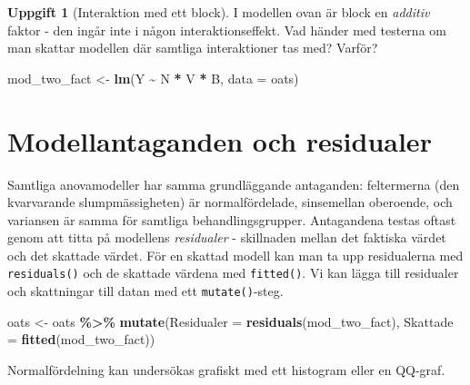 \documentclass[
]{book}
\newenvironment{Shaded}{\begin{snugshade}}{\end{snugshade}}
\newcommand{\AttributeTok}[1]{\textcolor[rgb]{0.13,0.29,0.53}{#1}}
\newcommand{\FunctionTok}[1]{\textcolor[rgb]{0.13,0.29,0.53}{\textbf{#1}}}
\newcommand{\NormalTok}[1]{#1}
\newcommand{\OtherTok}[1]{\textcolor[rgb]{0.56,0.35,0.01}{#1}}
\newcommand{\SpecialCharTok}[1]{\textcolor[rgb]{0.81,0.36,0.00}{\textbf{#1}}}
\theoremstyle{definition}
\theoremstyle{definition}
\theoremstyle{definition}
\newtheorem{exercise}{Uppgift}[chapter]
\theoremstyle{definition}
\theoremstyle{remark}
\begin{document}
\begin{exercise}[Interaktion med ett block]

I modellen ovan är block en \emph{additiv} faktor - den ingår inte i någon interaktionseffekt. Vad händer med testerna om man skattar modellen där samtliga interaktioner tas med? Varför?

\begin{Shaded}
\begin{Highlighting}[]
\NormalTok{mod\_two\_fact }\OtherTok{\textless{}{-}} \FunctionTok{lm}\NormalTok{(Y }\SpecialCharTok{\textasciitilde{}}\NormalTok{ N }\SpecialCharTok{*}\NormalTok{ V }\SpecialCharTok{*}\NormalTok{ B, }\AttributeTok{data =}\NormalTok{ oats)}
\end{Highlighting}
\end{Shaded}

\end{exercise}

\section{Modellantaganden och residualer}\label{modellantaganden-och-residualer}

Samtliga anovamodeller har samma grundläggande antaganden: feltermerna (den kvarvarande slumpmässigheten) är normalfördelade, sinsemellan oberoende, och variansen är samma för samtliga behandlingsgrupper. Antagandena testas oftast genom att titta på modellens \emph{residualer} - skillnaden mellan det faktiska värdet och det skattade värdet. För en skattad modell kan man ta upp residualerna med \texttt{residuals()} och de skattade värdena med \texttt{fitted()}. Vi kan lägga till residualer och skattningar till datan med ett \texttt{mutate()}-steg.

\begin{Shaded}
\begin{Highlighting}[]
\NormalTok{oats }\OtherTok{\textless{}{-}}\NormalTok{ oats }\SpecialCharTok{\%\textgreater{}\%} 
  \FunctionTok{mutate}\NormalTok{(}\AttributeTok{Residualer =} \FunctionTok{residuals}\NormalTok{(mod\_two\_fact),}
         \AttributeTok{Skattade =} \FunctionTok{fitted}\NormalTok{(mod\_two\_fact))}
\end{Highlighting}
\end{Shaded}

Normalfördelning kan undersökas grafiskt med ett histogram eller en QQ-graf.
\end{document}

